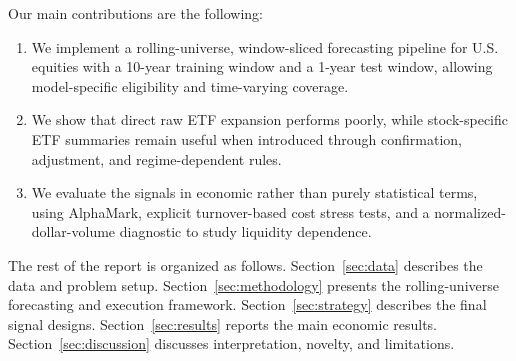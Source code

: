Our main contributions are the following:
\begin{enumerate}[leftmargin=1.4em]
  \item We implement a rolling-universe, window-sliced forecasting pipeline for U.S. equities with a 10-year training window and a 1-year test window, allowing model-specific eligibility and time-varying coverage.
  \item We show that direct raw ETF expansion performs poorly, while stock-specific ETF summaries remain useful when introduced through confirmation, adjustment, and regime-dependent rules.
  \item We evaluate the signals in economic rather than purely statistical terms, using AlphaMark, explicit turnover-based cost stress tests, and a normalized-dollar-volume diagnostic to study liquidity dependence.
\end{enumerate}

The rest of the report is organized as follows. Section~\ref{sec:data} describes the data and problem setup. Section~\ref{sec:methodology} presents the rolling-universe forecasting and execution framework. Section~\ref{sec:strategy} describes the final signal designs. Section~\ref{sec:results} reports the main economic results. Section~\ref{sec:discussion} discusses interpretation, novelty, and limitations.
